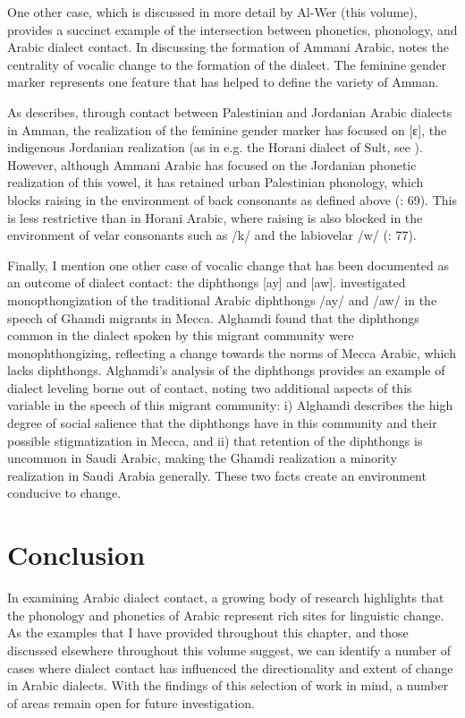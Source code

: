 \documentclass[output=paper]{langsci/langscibook}
\begin{document}
One other case, which is discussed in more detail by Al-Wer (this volume), provides a succinct example of the intersection between phonetics, phonology, and Arabic dialect contact. In discussing the formation of Ammani Arabic, \citet{Al-Wer2007} notes the centrality of vocalic change to the formation of the dialect. The feminine gender marker represents one feature that has helped to define the variety of Amman. 

As \citet{Al-Wer2007} describes, through contact between Palestinian and Jordanian Arabic dialects in Amman, the realization of the feminine gender marker has focused on [ɛ], the indigenous Jordanian realization (as in e.g. the Horani dialect of Sult, see \citealt{Herin2014salt}). However, although Ammani Arabic has focused on the Jordanian phonetic realization of this vowel, it has retained urban Palestinian phonology, which blocks raising in the environment of back consonants as defined above (\citealt{Al-Wer2007}: 69). This is less restrictive than in Horani Arabic, where raising is also blocked in the environment of velar consonants such as /k/ and the labiovelar /w/ (\citealt{Al-WerEtAl2015}: 77). 

  Finally, I mention one other case of vocalic change that has been documented as an outcome of dialect contact: the diphthongs [ay] and [aw]. \citet{Alghamdi2014} investigated monopthongization of the traditional Arabic diphthongs /ay/ and /aw/ in the speech of Ghamdi migrants in Mecca. Alghamdi found that the diphthongs common in the dialect spoken by this migrant community were monophthongizing, reflecting a change towards the norms of Mecca Arabic, which lacks diphthongs. Alghamdi’s analysis of the diphthongs provides an example of dialect leveling borne out of contact, noting two additional aspects of this variable in the speech of this migrant community: i) Alghamdi describes the high degree of social salience that the diphthongs have in this community and their possible stigmatization in Mecca, and ii) that retention of the diphthongs is uncommon in Saudi Arabic, making the Ghamdi realization a minority realization in Saudi Arabia generally. These two facts create an environment conducive to change.

\section{Conclusion}

In examining Arabic dialect contact, a growing body of research highlights that the phonology and phonetics of Arabic represent rich sites for linguistic change. As the examples that I have provided throughout this chapter, and those discussed elsewhere throughout this volume suggest, we can identify a number of cases where dialect contact has influenced the directionality and extent of change in Arabic dialects. With the findings of this selection of work in mind, a number of areas remain open for future investigation. 
\end{document}
